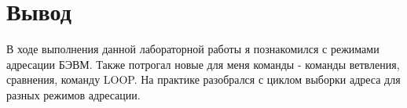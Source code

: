 \section{Вывод}
В ходе выполнения данной лабораторной работы я познакомился с режимами адресации БЭВМ. Также потрогал новые для меня команды - команды ветвления, сравнения, команду LOOP. На практике разобрался с циклом выборки адреса для разных режимов адресации.